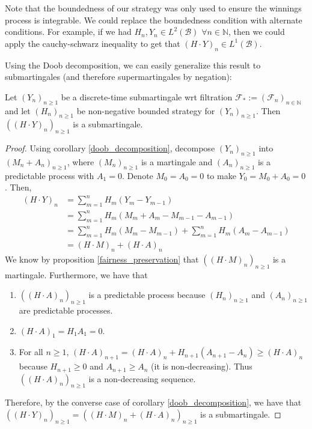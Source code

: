 Note that the boundedness of our strategy was only used to ensure the winnings process is integrable. We could replace the boundedness condition with alternate conditions. For example, if we had $H_{n}, Y_{n} \in L^{2}(\mathcal{B})$ $\forall n \in \mathbb{N}$, then we could apply the cauchy-schwarz inequality to get that $(H \cdot Y)_{n} \in L^{1}(\mathcal{B})$.

Using the Doob decomposition, we can easily generalize this result to submartingales (and therefore supermartingales by negation):

\begin{corollary}
    \label{favorability_preservation}
    Let $(Y_{n})_{n \geq 1}$ be a discrete-time submartingale wrt filtration $\mathcal{F}_{*} := (\mathcal{F}_{n})_{n \in \mathbb{N}}$ and let \((H_{n})_{n \geq 1}\) be non-negative bounded strategy for \((Y_{n})_{n \geq 1}\). Then \(((H \cdot Y)_{n})_{n \geq 1}\) is a submartingale.
\end{corollary}
    
\begin{proof}
    Using corollary \ref{doob_decomposition}, decompose \((Y_{n})_{n \geq 1}\) into \((M_{n} + A_{n})_{n \geq 1}\), where \((M_{n})_{n \geq 1}\) is a martingale and \((A_{n})_{n \geq 1}\) is a predictable process with \(A_{1} = 0\). Denote \(M_{0} = A_{0} = 0\) to make \(Y_{0} = M_{0} + A_{0} = 0\). Then,
    \begin{align*}
        (H \cdot Y)_{n} &= \sum\limits_{m=1}^{n}H_{m}(Y_{m} - Y_{m-1}) \\
        &= \sum\limits_{m=1}^{n}H_{m}(M_{m} + A_{m} - M_{m-1} - A_{m-1}) \\
        &= \sum\limits_{m=1}^{n}H_{m}(M_{m} - M_{m-1}) + \sum\limits_{m=1}^{n}H_{m}( A_{m}  - A_{m-1}) \\
        &= (H \cdot M)_{n} + (H \cdot A)_{n}
    \end{align*}
    We know by proposition \ref{fairness_preservation} that \(((H \cdot M)_{n})_{n \geq 1}\) is a martingale. Furthermore, we have that 
    \begin{enumerate}
        \item \(((H \cdot A)_{n})_{n \geq 1}\) is a predictable process because  \((H_{n})_{n \geq 1}\) and \((A_{n})_{n \geq 1}\) are predictable processes.
        \item \((H \cdot A)_{1} = H_{1} A_{1} = 0\).
        \item For all \(n \geq 1\), \((H \cdot A)_{n+1} = (H \cdot A)_{n} + H_{n+1} (A_{n+1} - A_{n}) \geq (H \cdot A)_{n}\) because \(H_{n+1} \geq 0\) and \(A_{n+1} \geq A_{n}\) (it is non-decreasing). Thus \(((H \cdot A)_{n})_{n \geq 1}\) is a non-decreasing sequence. 
    \end{enumerate}

    Therefore, by the converse case of corollary \ref{doob_decomposition}, we have that  \(((H \cdot Y)_{n})_{n \geq 1} = ( (H \cdot M)_{n} + (H \cdot A)_{n})_{n \geq 1}\) is a submartingale.
\end{proof}

